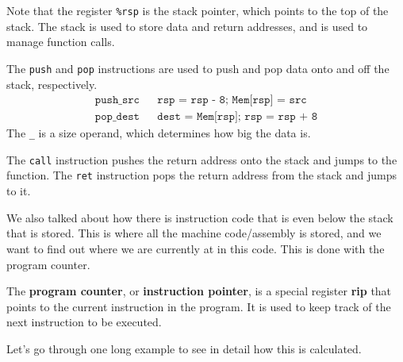 \documentclass{article}
\begin{document}
      Note that the register \texttt{\%rsp} is the stack pointer, which points to the top of the stack. The stack is used to store data and return addresses, and is used to manage function calls. 

      \begin{definition}
        The \texttt{push} and \texttt{pop} instructions are used to push and pop data onto and off the stack, respectively. 
        \begin{align*}
          \texttt{push\_ src} && \texttt{rsp = rsp - 8; Mem[rsp] = src} \\
          \texttt{pop\_ dest} && \texttt{dest = Mem[rsp]; rsp = rsp + 8} 
        \end{align*}
        The \texttt{\_} is a size operand, which determines how big the data is.
      \end{definition}

      \begin{definition}
        The \texttt{call} instruction pushes the return address onto the stack and jumps to the function. The \texttt{ret} instruction pops the return address from the stack and jumps to it.
      \end{definition}

      We also talked about how there is instruction code that is even below the stack that is stored. This is where all the machine code/assembly is stored, and we want to find out where we are currently at in this code. This is done with the program counter. 

      \begin{definition} 
        The \textbf{program counter}, or \textbf{instruction pointer}, is a special register \textbf{rip} that points to the current instruction in the program. It is used to keep track of the next instruction to be executed.
      \end{definition}

      Let's go through one long example to see in detail how this is calculated. 
      
\end{document}
